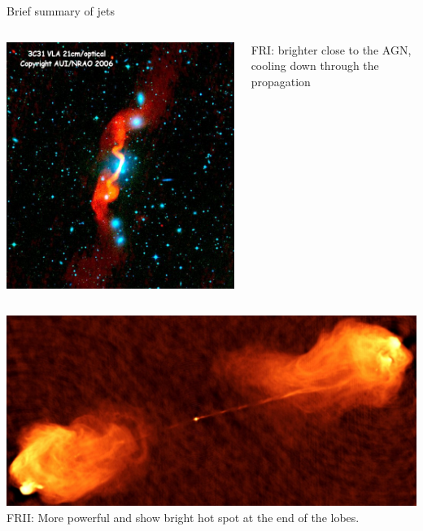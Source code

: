 \begin{frame}{Brief summary of jets}
\begin{columns}
\begin{column}{.5\textwidth}
\begin{columns}
\begin{column}{0.6\textwidth}
   \includegraphics[width=\textwidth]{images/fr1.jpg}
   \end{column}
   \begin{column}{0.4\textwidth}
	   {\scriptsize FRI: brighter close to the AGN, cooling down through the propagation
   } \end{column}
	\end{columns}
	  \vspace{0.1cm}
   \includegraphics[width=\textwidth]{images/fr2.jpg} \\
	  {\scriptsize FRII: More powerful and show bright hot spot at the end of the lobes.
  } \end{column}
 \end{columns}
\end{frame}

